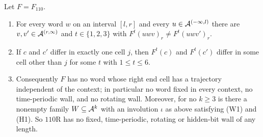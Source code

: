 \begin{proposition}[no walls in $110$R]\label{cl:prop:nowalls}
Let $F=F_{110}$.
\begin{enumerate}
\item For every word $w$ on an interval $[l,r]$ and every $u\in\mathcal{A}^{(-\infty,l)}$ there are $v,v'\in\mathcal{A}^{(r,\infty)}$ and $t\in\{1,2,3\}$ with $F^t(uwv)_r\ne F^t(uwv')_r$.
\item If $c$ and $c'$ differ in exactly one cell $j$, then $F^t(c)$ and $F^t(c')$ differ in some cell other than $j$ for some $t$ with $1\le t\le6$.
\item Consequently $F$ has no word whose right end cell has a trajectory independent of the context; in particular no word fixed in every context, no time-periodic wall, and no rotating wall. Moreover, for no $k\ge3$ is there a nonempty family $W\subseteq\mathcal{A}^k$ with an involution $\iota$ as above satisfying \textup{(W1)} and \textup{(H1)}. So $110$R has no fixed, time-periodic, rotating or hidden-bit wall of any length.
\end{enumerate}
\end{proposition}

